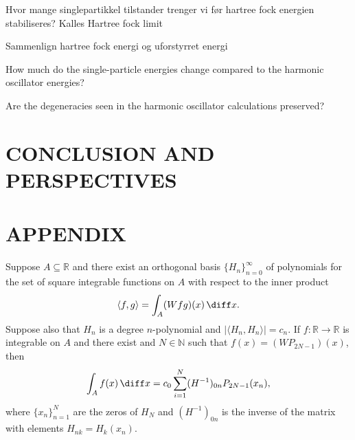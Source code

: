 \documentclass[11pt,english,a4paper]{article}
\begin{document}
Hvor mange singlepartikkel tilstander trenger vi før hartree fock energien stabiliseres? Kalles Hartree fock limit

Sammenlign hartree fock energi og uforstyrret energi

How much do the single-particle energies change compared to the harmonic
oscillator energies? 

Are the degeneracies seen in the harmonic oscillator calculations preserved?

\section*{\uppercase{Conclusion and perspectives}}

\section*{\uppercase{Appendix}}
\begin{theorem}
Suppose $A \subseteq \mathbb{R}$ and there exist an orthogonal basis $\{H_n\}_{n=0}^\infty$ of polynomials for the set of square integrable functions on $A$ with respect to the inner product
\[
\langle f,g\rangle = \int_A (Wfg)(x)\, \diff x.
\]
Suppose also that $H_n$ is a degree $n$-polynomial and $|\langle H_n,H_n \rangle| = c_n$. If $f: \mathbb{R} \to \mathbb{R}$ is integrable on $A$ and there exist and $N \in \mathbb{N}$ such that $f(x) = (WP_{2N-1})(x)$, then 
\[
\int_A f(x)\, \diff x = c_0 \sum_{i=1}^N (H^{-1})_{0n} P_{2N-1}(x_n),
\]
where $\{x_n\}_{n=1}^N$ are the zeros of $H_N$ and $(H^{-1})_{0n}$ is the inverse of the matrix with elements $H_{nk} = H_k(x_n)$. \label{thm:quad}
\end{theorem}
\end{document}
